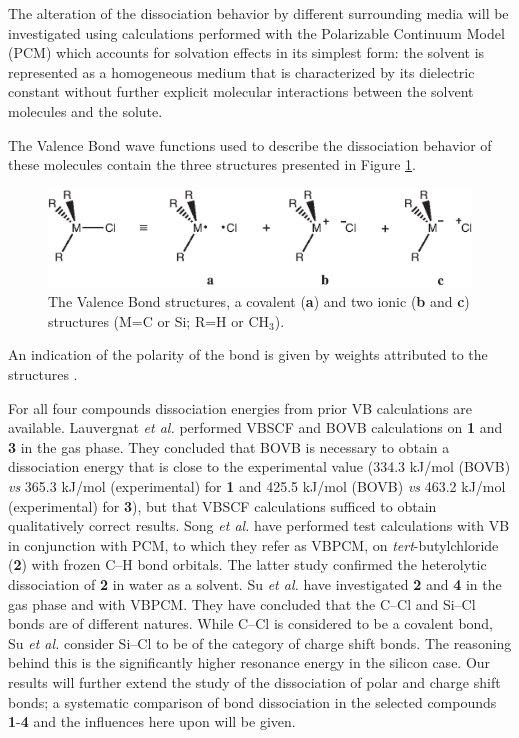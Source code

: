 The alteration of the dissociation behavior by different surrounding media will be investigated using calculations performed with the Polarizable Continuum Model (PCM) \cite{pcm1,pcm2} which accounts for solvation effects in its simplest form: the solvent is represented as a homogeneous medium that is characterized by its dielectric constant without further explicit molecular interactions between the solvent molecules and the solute. 

The Valence Bond wave functions used to describe the dissociation behavior of these molecules contain the three structures presented in Figure \ref{ch3.fig.structures}.
\begin{figure}[htbp]
\begin{center}
\includegraphics{dissociation/figures/structures.eps}
\end{center}
\caption{The Valence Bond structures, a covalent (\textbf{a}) and two ionic (\textbf{b} and \textbf{c}) structures (M=C or Si; R=H or CH$_3$).}
\label{ch3.fig.structures}
\end{figure}
An indication of the polarity of the bond is given by weights attributed to the structures \cite{coulson}. 

For all four compounds dissociation energies from prior VB calculations are available. Lauvergnat \textit{et al.} \cite{lauvergnat} performed VBSCF \cite{vbscf1,vbscf2} and BOVB \cite{bovb1,bovb2,bovb3} calculations on \textbf{1} and \textbf{3} in the gas phase. They concluded that BOVB is necessary to obtain a dissociation energy that is close to the experimental value (334.3 kJ/mol (BOVB) \textit{vs} 365.3 kJ/mol (experimental) for \textbf{1} and 425.5 kJ/mol (BOVB) \textit{vs} 463.2 kJ/mol (experimental) for \textbf{3}), but that VBSCF calculations sufficed to obtain qualitatively correct results.  Song \textit{et al.} \cite{song} have performed test calculations with VB in conjunction with PCM, to which they refer as VBPCM, on \textit{tert}-butylchloride (\textbf{2}) with frozen C--H bond orbitals. The latter study confirmed the heterolytic dissociation of \textbf{2} in water as a solvent. Su \textit{et al.} \cite{psu} have investigated \textbf{2} and \textbf{4} in the gas phase and with VBPCM. They have concluded that the C--Cl and Si--Cl bonds are of different natures. While C--Cl is considered to be a covalent bond, Su \textit{et al.} consider Si--Cl to be of the category of charge shift bonds. The reasoning behind this is the significantly higher resonance energy in the silicon case. Our results will further extend the study of the dissociation of polar and charge shift bonds; a systematic comparison of bond dissociation in the selected compounds \textbf{1}-\textbf{4} and the influences here upon will be given.

